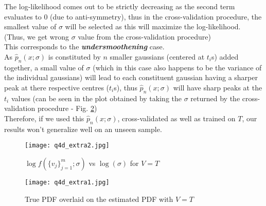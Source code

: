 \documentclass[11pt, fleqn]{article}
\begin{document}
The log-likelihood comes out to be strictly decreasing as the second term evaluates to $0$ (due to anti-symmetry), thus in the cross-validation procedure, the smallest value of $\sigma$ will be selected as this will maximize the log-likelihood. (Thus, we get wrong $\sigma$ value from the cross-validation procedure)\\
This corresponds to the \textbf{\textit{undersmoothening}} case.\\
As $\hat p_n(x;\sigma)$ is constituted by $n$ smaller gaussians (centered at $t_i$s) added together, a small value of $\sigma$ (which in this case also happens to be the variance of the individual gaussians) will lead to each constituent gaussian having a sharper peak at there respective centres ($t_i$s), thus $\hat p_n(x;\sigma)$ will have sharp peaks at the $t_i$ values (can be seen in the plot obtained by taking the $\sigma$ returned by the cross-validation procedure - Fig. \ref{fig:q4d_extra1})\\
Therefore, if we used this $\hat p_n(x;\sigma)$, cross-validated as well as trained on $T$, our results won't generalize well on an unseen sample.


\begin{figure}[H]
    \centering
    \texttt{[image: q4d\_extra2.jpg]}
    \caption{$\log f(\{v_j\}_{j=1}^{m}; \sigma)$ vs $\log(\sigma)$ for $V=T$}
    \label{fig:q4d_extra2}
\end{figure}

\begin{figure}[H]
    \centering
    \texttt{[image: q4d\_extra1.jpg]}
    \caption{True PDF overlaid on the estimated PDF with $V=T$}
    \label{fig:q4d_extra1}
\end{figure}
\end{document}
